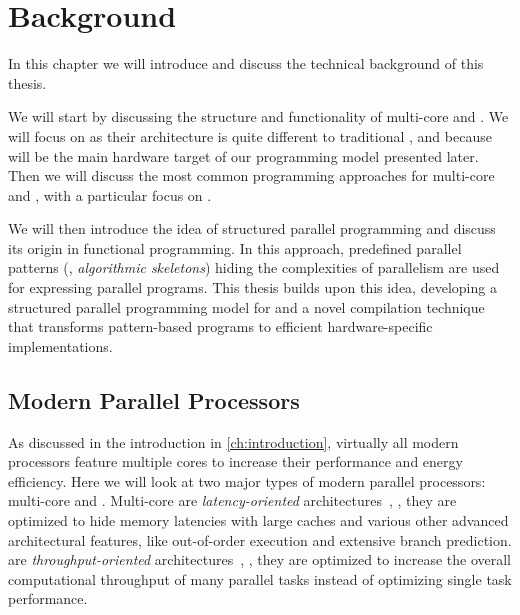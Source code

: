 
\chapter{Background} %

\label{chapter:background}
\label{chapter:state-of-the-art}

In this chapter we will introduce and discuss the technical background of this thesis.

We will start by discussing the structure and functionality of multi-core \CPUs and \GPUs.
We will focus on \GPUs as their architecture is quite different to traditional \CPUs, and because \GPUs will be the main hardware target of our \SkelCL programming model presented later.
Then we will discuss the most common programming approaches for multi-core \CPUs and \GPUs, with a particular focus on \OpenCL.

We will then introduce the idea of structured parallel programming and discuss its origin in functional programming.
In this approach, predefined parallel patterns (\aka, \emph{algorithmic skeletons}) hiding the complexities of parallelism are used for expressing parallel programs.
This thesis builds upon this idea, developing a structured parallel programming model for \GPUs and a novel compilation technique that transforms pattern-based programs to efficient hardware-specific implementations.

\section{Modern Parallel Processors}
As discussed in the introduction in \autoref{ch:introduction}, virtually all modern processors feature multiple cores to increase their performance and energy efficiency.
Here we will look at two major types of modern parallel processors: multi-core \CPUs and \GPUs.
Multi-core \CPUs are \emph{latency-oriented} architectures~\cite{GarlandK10}, \ie, they are optimized to hide memory latencies with large caches and various other advanced architectural features, like out-of-order execution and extensive branch prediction.
\GPUs are \emph{throughput-oriented} architectures~\cite{GarlandK10}, \ie, they are optimized to increase the overall computational throughput of many parallel tasks instead of optimizing single task performance.

